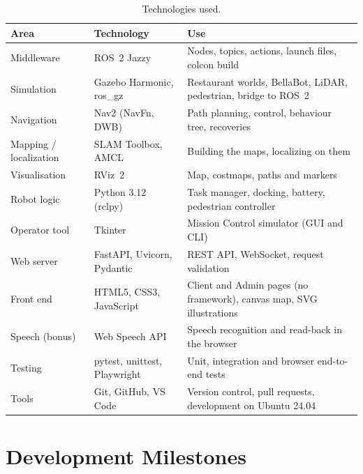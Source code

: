 \documentclass[11pt,a4paper]{article}
\begin{document}
\begin{table}[H]
\centering
\begin{tabularx}{\linewidth}{l l L}
\toprule
\textbf{Area} & \textbf{Technology} & \textbf{Use} \\
\midrule
Middleware & ROS~2 Jazzy & Nodes, topics, actions, launch files, colcon build \\
Simulation & Gazebo Harmonic, ros\_gz & Restaurant worlds, BellaBot, LiDAR, pedestrian, bridge to ROS~2 \\
Navigation & Nav2 (NavFn, DWB) & Path planning, control, behaviour tree, recoveries \\
Mapping / localization & SLAM Toolbox, AMCL & Building the maps, localizing on them \\
Visualisation & RViz~2 & Map, costmaps, paths and markers \\
Robot logic & Python 3.12 (rclpy) & Task manager, docking, battery, pedestrian controller \\
Operator tool & Tkinter & Mission Control simulator (GUI and CLI) \\
Web server & FastAPI, Uvicorn, Pydantic & REST API, WebSocket, request validation \\
Front end & HTML5, CSS3, JavaScript & Client and Admin pages (no framework), canvas map, SVG illustrations \\
Speech (bonus) & Web Speech API & Speech recognition and read-back in the browser \\
Testing & pytest, unittest, Playwright & Unit, integration and browser end-to-end tests \\
Tools & Git, GitHub, VS Code & Version control, pull requests, development on Ubuntu 24.04 \\
\bottomrule
\end{tabularx}
\caption{Technologies used.}
\end{table}

\section{Development Milestones}
\end{document}
